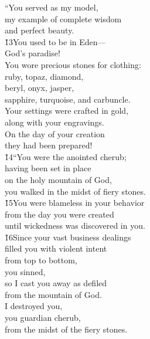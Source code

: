 \begin{poetry}
\poeml ``You served as my model, \\
\poemll    my example of complete wisdom \\
\poemlll       and perfect beauty. \\
\poeml \v{13}You used to be in Eden--- \\
\poemll    God's paradise! \\
\poeml You wore precious stones for clothing: \\
\poeml ruby, topaz, diamond, \\
\poemll    beryl, onyx, jasper, \\
\poemlll       sapphire, turquoise, and carbuncle. \\
\poeml Your settings were crafted in gold, \\
\poemll    along with your engravings. \\
\poeml On the day of your creation \\
\poemll    they had been prepared! \\
\poeml \v{14}``You were the anointed cherub; \\
\poemll    having been set in place \\
\poeml on the holy mountain of God, \\
\poemll    you walked in the midst of fiery stones. \\
\poeml \v{15}You were blameless in your behavior \\
\poemll    from the day you were created \\
\poemlll       until wickedness was discovered in you. \\
\poeml \v{16}Since your vast business dealings \\
\poemll    filled you with violent intent \\
\poeml from top to bottom, \\
\poemll    you sinned, \\
\poeml so I cast you away as defiled \\
\poemll    from the mountain of God. \\
\poeml I destroyed you, \\
\poemll    you guardian cherub, \\
\poemlll       from the midst of the fiery stones. \\

\end{poetry}
